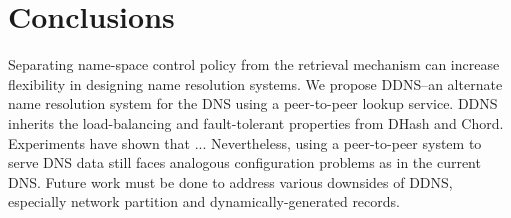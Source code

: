 \section{Conclusions}

Separating name-space control policy from the 
retrieval mechanism can increase flexibility 
in designing name resolution systems. 
We propose DDNS--an alternate name resolution system
for the DNS using a peer-to-peer lookup service. 
DDNS inherits the load-balancing and fault-tolerant 
properties from DHash and Chord. Experiments have
shown that ...
Nevertheless, using a peer-to-peer system to 
serve DNS data still faces analogous
configuration problems as in the current DNS.
Future work must be done to address various
downsides of DDNS, especially network partition
and dynamically-generated records.
